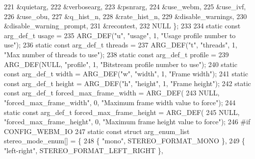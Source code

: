\begin{DoxyCodeInclude}
{{221                                         &quietarg,
222                                         &verbosearg,
223                                         &psnrarg,
224                                         &use\_webm,
225                                         &use\_ivf,
226                                         &use\_obu,
227                                         &q\_hist\_n,
228                                         &rate\_hist\_n,
229                                         &disable\_warnings,
230                                         &disable\_warning\_prompt,
231                                         &recontest,
232                                         NULL \};
233 
234 \textcolor{keyword}{static} \textcolor{keyword}{const} arg\_def\_t usage =
235     ARG\_DEF(\textcolor{stringliteral}{"u"}, \textcolor{stringliteral}{"usage"}, 1, \textcolor{stringliteral}{"Usage profile number to use"});
236 \textcolor{keyword}{static} \textcolor{keyword}{const} arg\_def\_t threads =
237     ARG\_DEF(\textcolor{stringliteral}{"t"}, \textcolor{stringliteral}{"threads"}, 1, \textcolor{stringliteral}{"Max number of threads to use"});
238 \textcolor{keyword}{static} \textcolor{keyword}{const} arg\_def\_t profile =
239     ARG\_DEF(NULL, \textcolor{stringliteral}{"profile"}, 1, \textcolor{stringliteral}{"Bitstream profile number to use"});
240 \textcolor{keyword}{static} \textcolor{keyword}{const} arg\_def\_t width = ARG\_DEF(\textcolor{stringliteral}{"w"}, \textcolor{stringliteral}{"width"}, 1, \textcolor{stringliteral}{"Frame width"});
241 \textcolor{keyword}{static} \textcolor{keyword}{const} arg\_def\_t height = ARG\_DEF(\textcolor{stringliteral}{"h"}, \textcolor{stringliteral}{"height"}, 1, \textcolor{stringliteral}{"Frame height"});
242 \textcolor{keyword}{static} \textcolor{keyword}{const} arg\_def\_t forced\_max\_frame\_width = ARG\_DEF(
243     NULL, \textcolor{stringliteral}{"forced\_max\_frame\_width"}, 0, \textcolor{stringliteral}{"Maximum frame width value to force"});
244 \textcolor{keyword}{static} \textcolor{keyword}{const} arg\_def\_t forced\_max\_frame\_height = ARG\_DEF(
245     NULL, \textcolor{stringliteral}{"forced\_max\_frame\_height"}, 0, \textcolor{stringliteral}{"Maximum frame height value to force"});
246 \textcolor{preprocessor}{#if CONFIG\_WEBM\_IO}
247 \textcolor{keyword}{static} \textcolor{keyword}{const} \textcolor{keyword}{struct }arg\_enum\_list stereo\_mode\_enum[] = \{
248   \{ \textcolor{stringliteral}{"mono"}, STEREO\_FORMAT\_MONO \},
249   \{ \textcolor{stringliteral}{"left-right"}, STEREO\_FORMAT\_LEFT\_RIGHT \},
}}
\end{DoxyCodeInclude}
